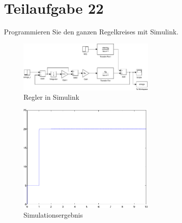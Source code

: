 \section{Teilaufgabe 22}
\begin{aufgabe}
    Programmieren Sie den ganzen Regelkreises mit Simulink.
\end{aufgabe}
\begin{figure}[h!]
    \centering
    \includegraphics[width=0.6\textwidth]{22/regler_pi.pdf}
    \caption{Regler in Simulink}
    \label{fig:22}
\end{figure}
\begin{figure}[h!]
    \centering
    \includegraphics[width=0.6\textwidth]{22/regler_pi_plot.pdf}
    \caption{Simulationsergebnis}
    \label{fig:22plot}
\end{figure}

